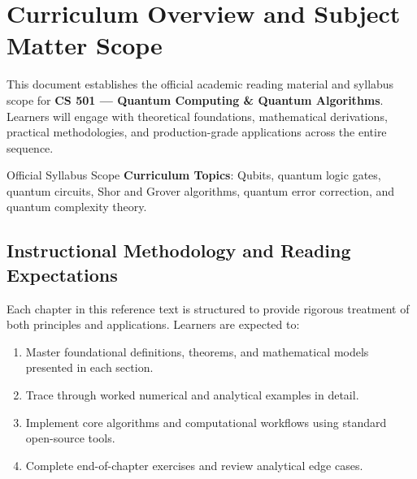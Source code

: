 \section{Curriculum Overview and Subject Matter Scope}

This document establishes the official academic reading material and syllabus scope for \textbf{CS 501 --- Quantum Computing \& Quantum Algorithms}. Learners will engage with theoretical foundations, mathematical derivations, practical methodologies, and production-grade applications across the entire sequence.

\begin{InsightBox}{Official Syllabus Scope}
  \textbf{Curriculum Topics}: Qubits, quantum logic gates, quantum circuits, Shor and Grover algorithms, quantum error correction, and quantum complexity theory.
\end{InsightBox}

\subsection{Instructional Methodology and Reading Expectations}

Each chapter in this reference text is structured to provide rigorous treatment of both principles and applications. Learners are expected to:
\begin{enumerate}
  \item Master foundational definitions, theorems, and mathematical models presented in each section.
  \item Trace through worked numerical and analytical examples in detail.
  \item Implement core algorithms and computational workflows using standard open-source tools.
  \item Complete end-of-chapter exercises and review analytical edge cases.
\end{enumerate}

